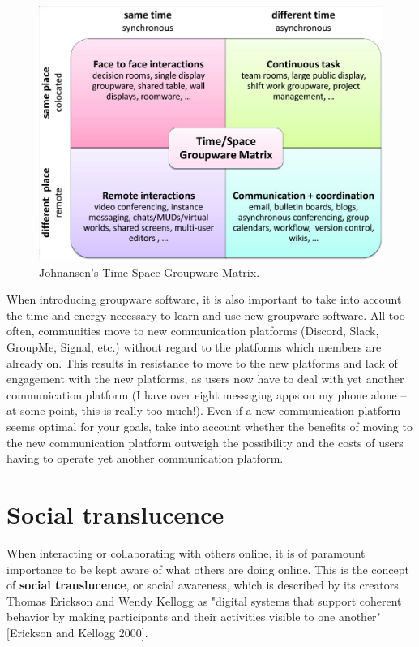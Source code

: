 \documentclass[class=book, crop=false]{standalone}
\providecommand{\keyterm}[1]{\textbf{#1}\marginnote{\scriptsize \textbf{#1}}}
\begin{document}
\begin{figure}[!tbp]
  \centering
  \begin{minipage}[b]{0.8\textwidth}
    \includegraphics[width=\textwidth]{groupwarematrix}
    \caption{Johnansen's Time-Space Groupware Matrix.}
  \end{minipage}
\end{figure}

When introducing groupware software, it is also important to take into account the time and energy necessary to learn and use new groupware software. All too often, communities move to new communication platforms (Discord, Slack, GroupMe, Signal, etc.) without regard to the platforms which members are already on. This results in resistance to move to the new platforms and lack of engagement with the new platforms, as users now have to deal with yet another communication platform (I have over eight messaging apps on my phone alone -- at some point, this is really too much!). Even if a new communication platform seems optimal for your goals, take into account whether the benefits of moving to the new communication platform outweigh the possibility and the costs of users having to operate yet another communication platform.

\section{Social translucence}

When interacting or collaborating with others online, it is of paramount importance to be kept aware of what others are doing online. This is the concept of \keyterm{social translucence}, or social awareness, which is described by its creators Thomas Erickson and Wendy Kellogg as "digital systems that support coherent behavior by making participants and their activities visible to one another" [Erickson and Kellogg 2000].
\end{document}
